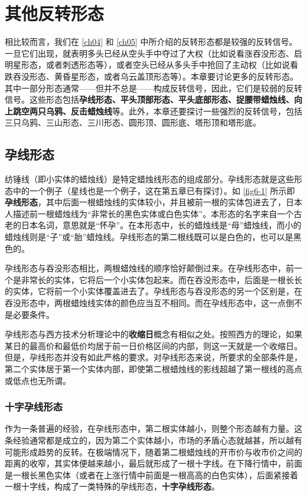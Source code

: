 \chapter{其他反转形态\label{ch06}}
相比较而言，我们在 \autoref{ch04} 和 \autoref{ch05} 中所介绍的反转形态都是较强的反转信号。一旦它们出现，就表明多头已经从空头手中夺过了大权（比如说看涨吞没形态、启明星形态，或者刺透形态等），或者空头已经从多头手中抢回了主动权（比如说看跌吞没形态、黄昏星形态，或者乌云盖顶形态等）。本章要讨论更多的反转形态。其中一部分形态通常——但并不总是——构成反转信号，因此，它们是较弱的反转信号。这些形态包括\textbf{孕线形态、平头顶部形态、平头底部形态、捉腰带蜡烛线、向上跳空两只乌鸦、反击蜡烛线}等。此外，本章还要探讨一些强烈的反转信号，包括三只乌鸦、三山形态、三川形态、圆形顶、圆形底、塔形顶和塔形底。
\section{孕线形态}
纺锤线（即小实体的蜡烛线）是特定蜡烛线形态的组成部分。孕线形态就是这些形态中的一个例子（星线也是一个例子，这在第五章已有探讨）。如 \autoref{fig6-1} 所示即\textbf{孕线形态}，其中后面一根蜡烛线的实体较小，并且被前一根的实体包进去了，日本人描述前一根蜡烛线为“非常长的黑色实体或白色实体”。本形态的名字来自一个古老的日本名词，意思就是“怀孕”。在本形态中，长的蜡烛线是“母”蜡烛线，而小的蜡烛线则是“子”或“胎”蜡烛线。孕线形态的第二根线既可以是白色的，也可以是黑色的。


孕线形态与吞没形态相比，两根蜡烛线的顺序恰好颠倒过来。在孕线形态中，前一个是非常长的实体，它将后一个小实体包起来。而在吞没形态中，后面是一根长长的实体，它将前一个小实体覆盖进去了。孕线形态与吞没形态的另一个区别是，在吞没形态中，两根蜡烛线实体的颜色应当互不相同。而在孕线形态中，这一点倒不是必要条件。

孕线形态与西方技术分析理论中的\textbf{收缩日}概念有相似之处。按照西方的理论，如果某日的最高价和最低价均居于前一日价格区间的内部，则这一天就是一个收缩日。但是，孕线形态并没有如此严格的要求。对孕线形态来说，所要求的全部条件是，第二个实体居于第一个实体内部，即使第二根蜡烛线的影线超越了第一根线的高点或低点也无所谓。
\subsection{十字孕线形态}
作为一条普遍的经验，在孕线形态中，第二根实体越小，则整个形态越有力量。这条经验通常都是成立的，因为第二个实体越小，市场的矛盾心态就越甚，所以越有可能形成趋势的反转。在极端情况下，随着第二根蜡烛线的开市价与收市价之间的距离的收窄，其实体便越来越小，最后就形成了一根十字线。在下降行情中，前面是一根长黑色实体（或者在上涨行情中前面是一根高高的白色实体），后面紧接着一根十字线，构成了一类特殊的孕线形态，\textbf{十字孕线形态}。

